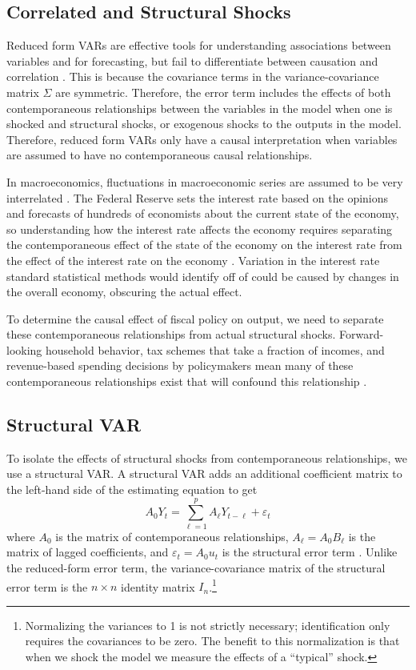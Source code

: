 \subsection{Correlated and Structural Shocks}

Reduced form VARs are effective tools for understanding associations between variables and for forecasting, but fail to differentiate between causation and correlation \parencite{stock2001vector}. This is because the covariance terms in the variance-covariance matrix $\Sigma$ are symmetric. Therefore, the error term includes the effects of both contemporaneous relationships between the variables in the model when one is shocked and structural shocks, or exogenous shocks to the outputs in the model. Therefore, reduced form VARs only have a causal interpretation when variables are assumed to have no contemporaneous causal relationships.

In macroeconomics, fluctuations in macroeconomic series are assumed to be very interrelated \parencites{sims1980macroeconomics}{shapiro1988sources}{blanchard1988dynamic}{cochrane1994shocks}{nakamura2018identification}. The Federal Reserve sets the interest rate based on the opinions and forecasts of hundreds of economists about the current state of the economy, so understanding how the interest rate affects the economy requires separating the contemporaneous effect of the state of the economy on the interest rate from the effect of the interest rate on the economy \parencite{nakamura2018identification}. Variation in the interest rate standard statistical methods would identify off of could be caused by changes in the overall economy, obscuring the actual effect.

To determine the causal effect of fiscal policy on output, we need to separate these contemporaneous relationships from actual structural shocks. Forward-looking household behavior, tax schemes that take a fraction of incomes, and revenue-based spending decisions by policymakers mean many of these contemporaneous relationships exist that will confound this relationship \parencites{blanchard2002empirical}{gali2020effects}.


\subsection{Structural VAR} \label{subsec:svar}

To isolate the effects of structural shocks from contemporaneous relationships, we use a structural VAR. A structural VAR adds an additional coefficient matrix to the left-hand side of the estimating equation to get
\[
    A_0 Y_t = \sum_{\ell = 1}^p A_\ell Y_{t - \ell} + \varepsilon_t
\]
where $A_0$ is the matrix of contemporaneous relationships, $A_\ell = A_0 B_\ell$ is the matrix of lagged coefficients, and $\varepsilon_t = A_0 u_t$ is the structural error term \parencite{neusser2016time}. Unlike the reduced-form error term, the variance-covariance matrix of the structural error term is the $n \times n$ identity matrix $I_n$.\footnote{Normalizing the variances to 1 is not strictly necessary; identification only requires the covariances to be zero. The benefit to this normalization is that when we shock the model we measure the effects of a ``typical'' shock.}

